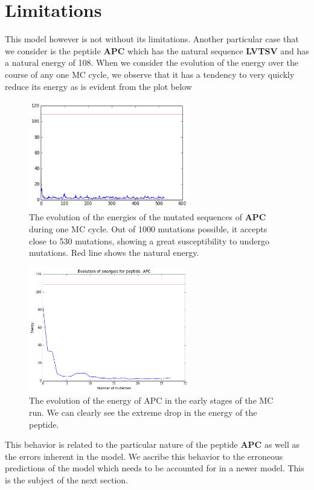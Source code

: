 \documentclass[a4paper, 12pt]{article}
\begin{document}
 	\section{Limitations}

 	This model however is not without its limitations. Another particular case that we consider is the peptide \textbf{APC} which has the natural sequence \textbf{LVTSV} and has a natural energy of 108. When we consider the evolution of the energy over the course of any one MC cycle, we observe that it has a tendency to very quickly reduce its energy as is evident from the plot below

 	\begin{figure}[!h]
 	\label{apc_evol}
 	\centering
 	\includegraphics[width=7cm]{Images/apc_evol.png} 
 	\caption{The evolution of the energies of the mutated sequences of \textbf{APC} during one MC cycle. Out of 1000 mutations possible, it accepts close to 530 mutations, showing a great susceptibility to undergo mutations. Red line shows the natural energy.}
 	\end{figure} 
 	
 	\begin{figure}[!h]
 	\label{apc_evol_zoom}
 	\centering
 	\includegraphics[width=7cm]{Images/apc_evol_zoom.png} 
 	\caption{The evolution of the energy of APC in the early stages of the MC run. We can clearly see the extreme drop in the energy of the peptide.}
 	\end{figure} 
 	
 	This behavior is related to the particular nature of the peptide \textbf{APC} as well as the errors inherent in the model. We ascribe this behavior to the erroneous predictions of the model which needs to be accounted for in a newer model. This is the subject of the next section.
 	
\end{document}
